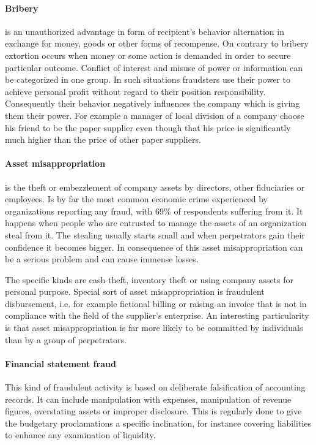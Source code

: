 \paragraph{Bribery} is an unauthorized advantage in form of recipient's behavior alternation in exchange for money, goods or other forms of recompense. On contrary to bribery extortion occurs when money or some action is demanded in order to secure particular outcome. Conflict of interest and misuse of power or information can be categorized in one group. In such situations fraudsters use their power to achieve personal profit without regard to their position responsibility. Consequently their behavior negatively influences the company which is giving them their power. For example a manager of local division of a company choose his friend to be the paper supplier even though that his price is significantly much higher than the price of other paper suppliers.


\paragraph {Asset misappropriation}
is the theft or embezzlement of company assets by directors, other fiduciaries or employees. Is by far the most common economic crime experienced by organizations reporting any fraud, with 69\% of respondents suffering from it. \cite{pwc-asset} It happens when people who are entrusted to manage the assets of an organization steal from it. The stealing usually starts small and when perpetrators gain their confidence it becomes bigger. In consequence of this asset misappropriation can be a serious problem and can cause immense losses. 

The specific kinds are cash theft, inventory theft or using company assets for personal purpose. Special sort of asset misappropriation is fraudulent disbursement, i.e. for example fictional billing or raising an invoice that is not in compliance with the field of the supplier's enterprise. An interesting particularity is that asset misappropriation is far more likely to be committed by individuals than by a group of perpetrators\cite{whitepaper}.


\paragraph {Financial statement fraud}
This kind of fraudulent activity is based on deliberate falsification of accounting records. It can include manipulation with expenses, manipulation of revenue figures, overstating assets or improper disclosure. This is regularly done to give the budgetary proclamations a specific inclination, for instance covering liabilities to enhance any examination of liquidity.

